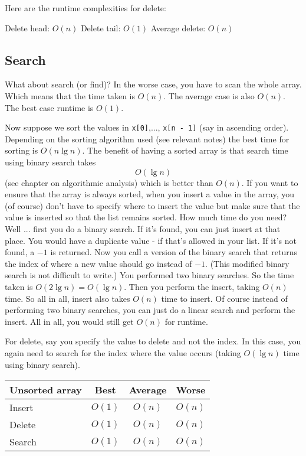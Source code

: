 Here are the runtime complexities for delete:
\begin{tightlist}
  \li Delete head: $O(n)$
  \li Delete tail: $O(1)$
  \li Average delete: $O(n)$
\end{tightlist}



\newpage
\subsection{Search}

What about search (or find)?
In the worse case, you have to scan the whole array.
Which means that the time taken is $O(n)$.
The average case is also $O(n)$.
The best case runtime is $O(1)$.

Now suppose we sort the values in 
\verb!x[0]!,...,
\verb!x[n - 1]!
(say in ascending order).
Depending on the sorting algorithm used
(see relevant notes)
the best time for sorting is 
$O(n \lg n)$.
The benefit of having a sorted array is that
search time using binary search takes
\[
O(\lg n)
\]
(see chapter on algorithmic analysis)
which is better than $O(n)$.
If you want to ensure that the array is always sorted,
when you insert a value in the array, you (of course)
don't have to specify where to insert the value but make sure 
that the value is inserted so that the list remains sorted.
How much time do you need?
Well ... first you do a binary search.
If it's found, you can just insert at that place.
You would have a duplicate value - if that's allowed in your list.
If it's not found, a $-1$ is returned.
Now you call a version of the binary search that returns
the index of where a new value should go instead of $-1$.
(This modified binary search is not difficult to write.)
You performed two binary searches.
So the time taken is $O(2\lg n) = O(\lg n)$.
Then you perform the insert, taking $O(n)$ time.
So all in all, insert also takes $O(n)$ time to insert.
Of course instead of performing two binary searches, you 
can just do a linear search and perform the insert.
All in all, you would still get $O(n)$ for runtime.

For delete, say you specify the value to delete
and not the index.
In this case, you again need to search for the index
where the value occurs 
(taking $O(\lg n)$ time using binary search).

\begin{longtable}{|l|c|c|c|}
\hline
Unsorted array & Best   & Average      & Worse  \\*
\hline\hline
Insert         & $O(1)$ & $O(n)$       & $O(n)$ \\*
Delete         & $O(1)$ & $O(n)$       & $O(n)$ \\*
Search         & $O(1)$ & $O(n)$       & $O(n)$ \\* 
\hline
\end{longtable}



